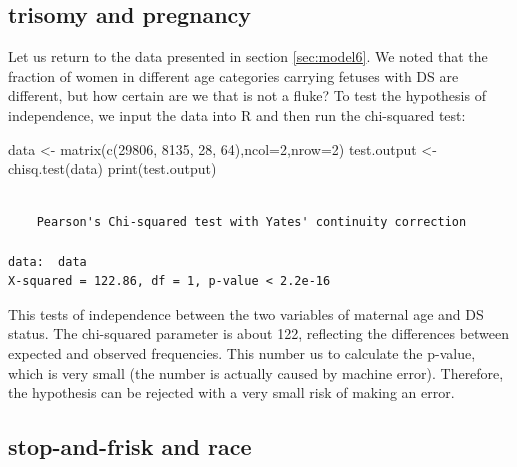 \documentclass[
  letterpaper,
  DIV=11,
  numbers=noendperiod]{scrreprt}
\newenvironment{Shaded}{\begin{snugshade}}{\end{snugshade}}
\newcommand{\AttributeTok}[1]{\textcolor[rgb]{0.40,0.45,0.13}{#1}}
\newcommand{\DecValTok}[1]{\textcolor[rgb]{0.68,0.00,0.00}{#1}}
\newcommand{\FunctionTok}[1]{\textcolor[rgb]{0.28,0.35,0.67}{#1}}
\newcommand{\NormalTok}[1]{\textcolor[rgb]{0.00,0.23,0.31}{#1}}
\newcommand{\OtherTok}[1]{\textcolor[rgb]{0.00,0.23,0.31}{#1}}
\begin{document}
\hypertarget{trisomy-and-pregnancy}{%
\subsection{trisomy and pregnancy}\label{trisomy-and-pregnancy}}

Let us return to the data presented in section \ref{sec:model6}. We
noted that the fraction of women in different age categories carrying
fetuses with DS are different, but how certain are we that is not a
fluke? To test the hypothesis of independence, we input the data into R
and then run the chi-squared test:

\begin{Shaded}
\begin{Highlighting}[]
\NormalTok{data }\OtherTok{\textless{}{-}} \FunctionTok{matrix}\NormalTok{(}\FunctionTok{c}\NormalTok{(}\DecValTok{29806}\NormalTok{, }\DecValTok{8135}\NormalTok{, }\DecValTok{28}\NormalTok{, }\DecValTok{64}\NormalTok{),}\AttributeTok{ncol=}\DecValTok{2}\NormalTok{,}\AttributeTok{nrow=}\DecValTok{2}\NormalTok{)}
\NormalTok{test.output }\OtherTok{\textless{}{-}} \FunctionTok{chisq.test}\NormalTok{(data)}
\FunctionTok{print}\NormalTok{(test.output)}
\end{Highlighting}
\end{Shaded}

\begin{verbatim}

    Pearson's Chi-squared test with Yates' continuity correction

data:  data
X-squared = 122.86, df = 1, p-value < 2.2e-16
\end{verbatim}

This tests of independence between the two variables of maternal age and
DS status. The chi-squared parameter is about 122, reflecting the
differences between expected and observed frequencies. This number us to
calculate the p-value, which is very small (the number is actually
caused by machine error). Therefore, the hypothesis can be rejected with
a very small risk of making an error.

\hypertarget{stop-and-frisk-and-race}{%
\subsection{stop-and-frisk and race}\label{stop-and-frisk-and-race}}
\end{document}
